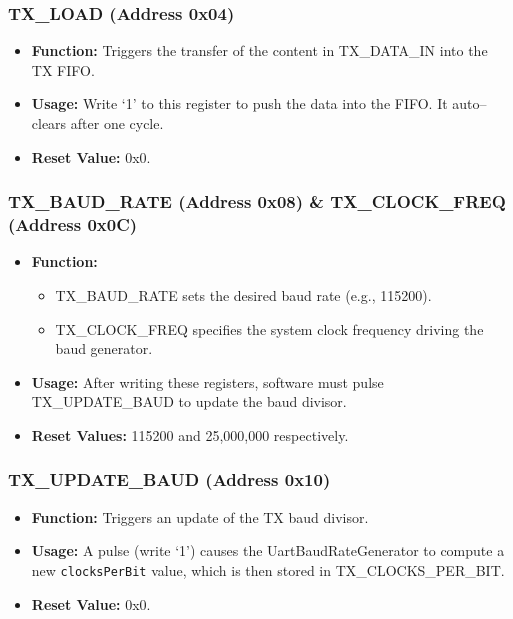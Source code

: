\subsubsection{TX\_LOAD (Address 0x04)}
\begin{itemize}[noitemsep]
    \item \textbf{Function:} Triggers the transfer of the content in TX\_DATA\_IN into the TX FIFO.
    \item \textbf{Usage:} Write ‘1’ to this register to push the data into the FIFO. It auto–clears after one cycle.
    \item \textbf{Reset Value:} 0x0.
\end{itemize}

\subsubsection{TX\_BAUD\_RATE (Address 0x08) \& TX\_CLOCK\_FREQ (Address 0x0C)}
\begin{itemize}[noitemsep]
    \item \textbf{Function:}
    \begin{itemize}
        \item TX\_BAUD\_RATE sets the desired baud rate (e.g., 115200).
        \item TX\_CLOCK\_FREQ specifies the system clock frequency driving the baud generator.
    \end{itemize}
    \item \textbf{Usage:} After writing these registers, software must pulse TX\_UPDATE\_BAUD to update the baud divisor.
    \item \textbf{Reset Values:} 115200 and 25,000,000 respectively.
\end{itemize}

\subsubsection{TX\_UPDATE\_BAUD (Address 0x10)}
\begin{itemize}[noitemsep]
    \item \textbf{Function:} Triggers an update of the TX baud divisor.
    \item \textbf{Usage:} A pulse (write ‘1’) causes the UartBaudRateGenerator to compute a new \texttt{clocksPerBit} value, which is then stored in TX\_CLOCKS\_PER\_BIT.
    \item \textbf{Reset Value:} 0x0.
\end{itemize}

